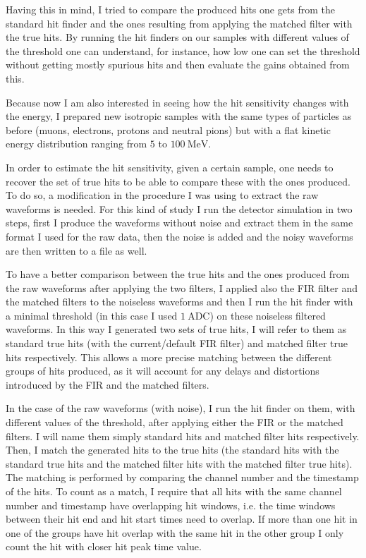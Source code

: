 Having this in mind, I tried to compare the produced hits one gets from the standard hit finder and the ones resulting from applying the matched filter with the true hits. By running the hit finders on our samples with different values of the threshold one can understand, for instance, how low one can set the threshold without getting mostly spurious hits and then evaluate the gains obtained from this.

Because now I am also interested in seeing how the hit sensitivity changes with the energy, I prepared new isotropic samples with the same types of particles as before (muons, electrons, protons and neutral pions) but with a flat kinetic energy distribution ranging from $5$ to $100 \ \mathrm{MeV}$.

In order to estimate the hit sensitivity, given a certain sample, one needs to recover the set of true hits to be able to compare these with the ones produced. To do so, a modification in the procedure I was using to extract the raw waveforms is needed. For this kind of study I run the detector simulation in two steps, first I produce the waveforms without noise and extract them in the same format I used for the raw data, then the noise is added and the noisy waveforms are then written to a file as well.

To have a better comparison between the true hits and the ones produced from the raw waveforms after applying the two filters, I applied also the FIR filter and the matched filters to the noiseless waveforms and then I run the hit finder with a minimal threshold (in this case I used $1 \ \mathrm{ADC}$) on these noiseless filtered waveforms. In this way I generated two sets of true hits, I will refer to them as standard true hits (with the current/default FIR filter) and matched filter true hits respectively. This allows a more precise matching between the different groups of hits produced, as it will account for any delays and distortions introduced by the FIR and the matched filters.

In the case of the raw waveforms (with noise), I run the hit finder on them, with different values of the threshold, after applying either the FIR or the matched filters. I will name them simply standard hits and matched filter hits respectively. Then, I match the generated hits to the true hits (the standard hits with the standard true hits and the matched filter hits with the matched filter true hits). The matching is performed by comparing the channel number and the timestamp of the hits. To count as a match, I require that all hits with the same channel number and timestamp have overlapping hit windows, i.e. the time windows between their hit end and hit start times need to overlap. If more than one hit in one of the groups have hit overlap with the same hit in the other group I only count the hit with closer hit peak time value.

